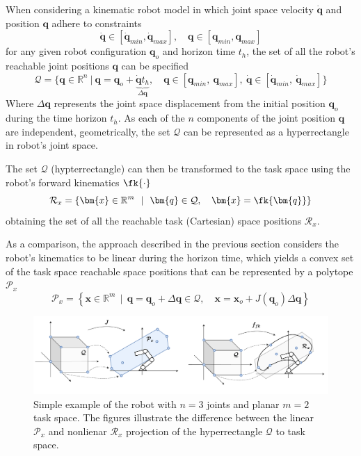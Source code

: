 When considering a kinematic robot model in which joint space velocity $\dot{\bm{q}}$ and position $\bm{q}$ adhere to constraints
\begin{equation}
   \dot{\bm{q}} \in \left[\dot{\bm{q}}_{min},\dot{\bm{q}}_{max}\right], \quad 
   \bm{q} \in \left[{\bm{q}}_{min},{\bm{q}}_{max}\right]
\end{equation}
for any given robot configuration $\bm{q}_o$ and horizon time $t_h$, the set of all the robot's reachable joint positions $\bm{q}$ can be specified
\begin{equation}
\mathcal{Q}= \{ \bm{q}\in\mathbb{R}^n ~|~ \bm{q} = \bm{q}_o + \underbrace{\dot{\bm{q}}t_h}_{\Delta \bm{q}}, \quad \bm{q}\in[\bm{q}_{min}, ~ \bm{q}_{max}],~ \dot{\bm{q}}\in[\dot{\bm{q}}_{min}, ~ \dot{\bm{q}}_{max}] \}
\end{equation}
Where $\Delta \bm{q}$ represents the joint space displacement from the initial position $\bm{q}_o$ during the time horizon $t_h$. As each of the $n$ components of the joint position $\bm{q}$ are independent, geometrically, the set $\mathcal{Q}$ can be represented as a hyperrectangle in robot's joint space. 

The set $\mathcal{Q}$ (hypterrectangle) can then be transformed to the task space using the robot's forward kinematics $\fk{\cdot}$
\begin{equation}
    \mathcal{R}_x= \left\{ \bm{x} \in \mathbb{R}^m~~|~~ {\bm{q}} \in \mathcal{Q}, \quad
    \bm{x} =\fk{\bm{q}}\right\}
\end{equation}
obtaining the set of all the reachable task (Cartesian) space positions $\mathcal{R}_x$.

As a comparison, the approach described in the previous section considers the robot's kinematics to be linear during the horizon time, which yields a convex set of the task space reachable space positions that can be represented by a polytope $\mathcal{P}_x$
\begin{equation}
    \mathcal{P}_x= \left\{ \bm{x} \in \mathbb{R}^m~~|~~ \bm{q} = \bm{q}_o + \Delta \bm{q} \in {\mathcal{Q}}, \quad 
    \bm{x} = \bm{x}_o + J(\bm{q}_o)\Delta \bm{q}\right\}
\end{equation}

\begin{figure}[!t]
    \centering
    \includegraphics[width=\textwidth]{Papers/images/curved_space_algo_new.pdf}
    \caption{Simple example of the robot with $n=3$ joints and planar $m=2$ task space. The figures illustrate the difference between the linear $\mathcal{P}_x$ and nonlienar $\mathcal{R}_x$ projection of the hyperrectangle $\mathcal{Q}$ to task space.}
    \label{fig:curved_space_algo_new}
\end{figure}


